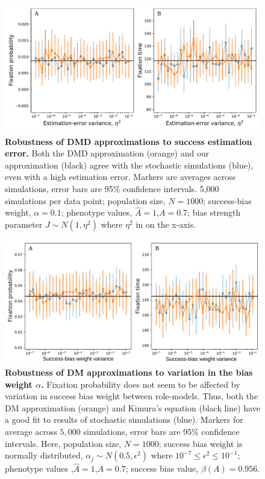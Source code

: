 \documentclass[12pt]{extarticle}
\begin{document}
\begin{figure}
    \includegraphics[width=\linewidth]{full_vs_dm_mutation.pdf}
  \caption{
  \textbf{Robustness of DMD approximations to success estimation error.}
  Both the DMD approximation (orange) and our approximation (black) agree with the stochastic simulations (blue), even with a high estimation error.
  Markers are averages across simulations, error bars are 95\% confidence intervals.
  5,000 simulations per data point; population size, $N=1000$; success-bias weight, $\alpha=0.1$; phenotype values, $\hat{A}=1$,$A=0.7$; bias strength parameter $J\sim N(1,\eta^2)$ where $\eta^2$ in on the x-axis.
  }	
  \label{fig:hetro_error}
\end{figure}


\begin{figure}
    \includegraphics[width=\linewidth]{full_vs_dm_changing_alpha.pdf}
   \caption{\textbf{Robustness of DM approximations to variation in the bias weight $\alpha$.} 
   Fixation probability does not seem to be affected by variation in success bias weight between role-models.
    Thus, both the DM approximation (orange) and Kimura's equation (black line) have a good fit to results of stochastic simulations (blue).
   Markers for average across $5,000$ simulations, error bars are 95\% confidence intervals.
  Here, population size, $N=1000$; 
  success bias weight is normally distributed, $\alpha_j \sim N(0.5,\epsilon^2)$ where $10^{-7}\le \epsilon^2 \le 10^{-1}$; 
  phenotype values ,$\hat{A}=1$,$A=0.7$; success bias value, $\beta(A)=0.956$.}	
  \label{fig:hetro_alpha}
\end{figure}
\end{document}
